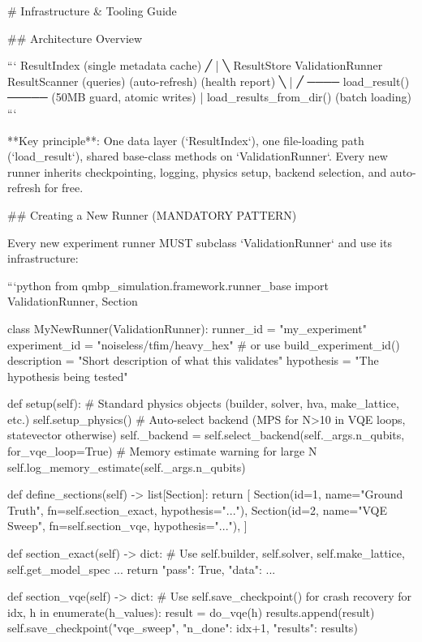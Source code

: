 # Infrastructure & Tooling Guide

## Architecture Overview

```
                    ResultIndex (single metadata cache)
                   ╱          |            ╲
          ResultStore    ValidationRunner    ResultScanner
          (queries)     (auto-refresh)      (health report)
                ╲            |            ╱
                 ──── load_result() ─────  (50MB guard, atomic writes)
                           |
                   load_results_from_dir()  (batch loading)
```

**Key principle**: One data layer (`ResultIndex`), one file-loading path (`load_result`),
shared base-class methods on `ValidationRunner`. Every new runner inherits checkpointing,
logging, physics setup, backend selection, and auto-refresh for free.

## Creating a New Runner (MANDATORY PATTERN)

Every new experiment runner MUST subclass `ValidationRunner` and use its infrastructure:

```python
from qmbp_simulation.framework.runner_base import ValidationRunner, Section

class MyNewRunner(ValidationRunner):
    runner_id = "my_experiment"
    experiment_id = "noiseless/tfim/heavy_hex"  # or use build_experiment_id()
    description = "Short description of what this validates"
    hypothesis = "The hypothesis being tested"

    def setup(self):
        # Standard physics objects (builder, solver, hva, make_lattice, etc.)
        self.setup_physics()
        # Auto-select backend (MPS for N>10 in VQE loops, statevector otherwise)
        self._backend = self.select_backend(self._args.n_qubits, for_vqe_loop=True)
        # Memory estimate warning for large N
        self.log_memory_estimate(self._args.n_qubits)

    def define_sections(self) -> list[Section]:
        return [
            Section(id=1, name="Ground Truth", fn=self.section_exact, hypothesis="..."),
            Section(id=2, name="VQE Sweep", fn=self.section_vqe, hypothesis="..."),
        ]

    def section_exact(self) -> dict:
        # Use self.builder, self.solver, self.make_lattice, self.get_model_spec
        ...
        return {"pass": True, "data": {...}}

    def section_vqe(self) -> dict:
        # Use self.save_checkpoint() for crash recovery
        for idx, h in enumerate(h_values):
            result = do_vqe(h)
            results.append(result)
            self.save_checkpoint("vqe_sweep", {"n_done": idx+1, "results": results})

